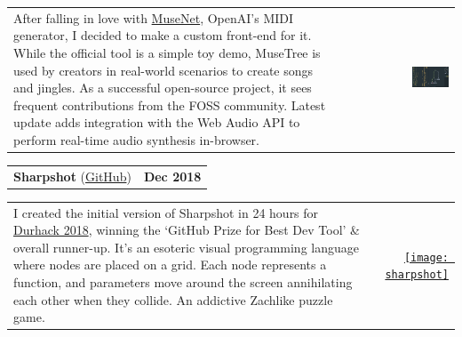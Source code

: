 \documentclass[hidelinks, 12pt, a4paper]{article}
\begin{document}
	\hspace{0.05\linewidth}\begin{tabularx}{0.95\linewidth}{Xr}
		\begin{minipage}{\linewidth}
			After falling in love with \href{https://openai.com/blog/musenet/}{MuseNet}, OpenAI's MIDI generator, I decided to make a custom front-end for it.
			While the official tool is a simple toy demo, MuseTree is used by creators in real-world scenarios to create songs and jingles.
			As a successful open-source project, it sees frequent contributions from the FOSS community.
			Latest update adds integration with the Web Audio API to perform real-time audio synthesis in-browser.
		\end{minipage} & \href{https://stevenwaterman.uk/musetree/}{\includegraphics[align=c, width=0.36\textwidth]{musetree}}
	\end{tabularx}

	\vspace{24pt}
	
	\begin{tabularx}{\linewidth}{X r}
		\textbf{Sharpshot} (\href{https://github.com/stevenwaterman/sharpshot}{GitHub}) & \textbf{Dec 2018}
	\end{tabularx}\vspace{2pt}
	
	\hspace{0.05\linewidth}\begin{tabularx}{0.95\linewidth}{Xr}
		\begin{minipage}{\linewidth}
				I created the initial version of Sharpshot in 24 hours for \href{http://www.durhack.com}{Durhack 2018}, winning the `GitHub Prize for Best Dev Tool' \& overall runner-up. It's an esoteric visual programming language where nodes are placed on a grid. Each node represents a function, and parameters move around the screen annihilating each other when they collide. An addictive Zachlike puzzle game.
		\end{minipage} & \href{https://github.com/stevenwaterman/sharpshot}{\texttt{[image: sharpshot]}}
	\end{tabularx}
\end{document}
